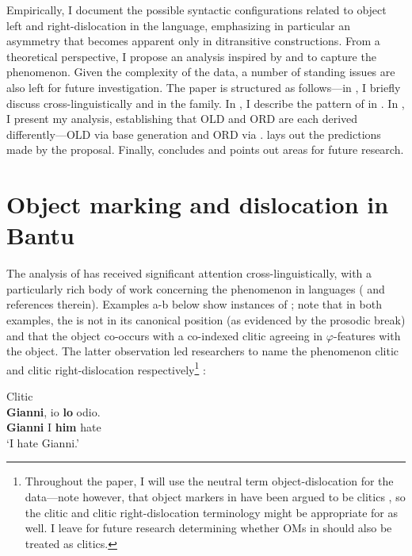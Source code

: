 \documentclass[output=paper
,newtxmath
,modfonts
,nonflat]{langsci/langscibook}
\begin{document}
Empirically, I document the possible syntactic configurations related to object left and right-dislocation in the language, emphasizing in particular an asymmetry that becomes apparent only in ditransitive constructions. From a theoretical perspective, I propose an analysis inspired by \citet{Cecchetto1999} and \citet{Zeller2015} to capture the phenomenon. Given the complexity of the data, a number of standing issues are also left for future investigation. The paper is structured as follows—in , I briefly discuss  cross-linguistically and in the  family. In , I describe the pattern of  in . In , I present my analysis, establishing that OLD and ORD are each derived differently—OLD via base generation and ORD via .  lays out the predictions made by the proposal. Finally,  concludes and points out areas for future research.

\section{Object marking and dislocation in Bantu}\label{sec:ranero:2}

The analysis of  has received significant attention cross-linguistically, with a particularly rich body of work concerning the phenomenon in  languages (\citealt{anagnostopouloutoappear} and references therein). Examples a-b below show instances of ; note that in both examples, the  is not in its canonical position (as evidenced by the prosodic break) and that the object co-occurs with a co-indexed clitic agreeing in $\varphi $-features with the object. The latter observation led researchers to name the phenomenon clitic  and clitic right-dislocation respectively\footnote{Throughout the paper, I will use the neutral term object-dislocation for the  data—note however, that object markers in  have been argued to be clitics \citep{diercks2015}, so the clitic  and clitic right-dislocation terminology might be appropriate for  as well. I leave for future research determining whether OMs in  should also be treated as clitics.} :

\ea\label{ex:ranero:2}
 \citep{Cecchetto1999}
\ea\label{ex:ranero:2a} Clitic \\
\gll \textbf{Gianni}, io \textbf{lo}    odio. \\ 
\textbf{Gianni} I   \textbf{him} hate      \\
\glt ‘I hate Gianni.’ 
\end{document}
